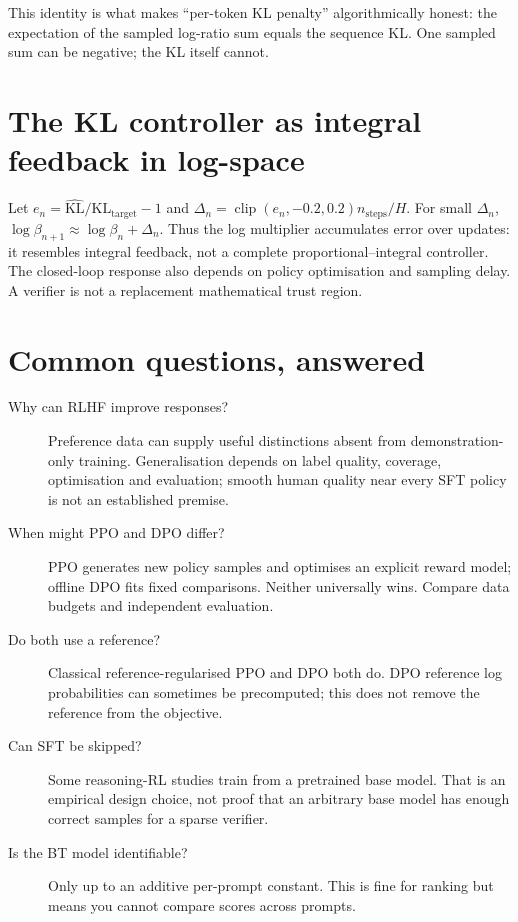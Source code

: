 \documentclass[11pt,oneside]{scrbook}
\begin{document}
This identity is what makes ``per-token KL penalty'' algorithmically
honest: the expectation of the sampled log-ratio sum equals the sequence KL.
One sampled sum can be negative; the KL itself cannot.

\section{The KL controller as integral feedback in log-space}
Let $e_n=\widehat{\mathrm{KL}}/\mathrm{KL}_{\mathrm{target}}-1$ and
$\Delta_n=\operatorname{clip}(e_n,-0.2,0.2)n_{\mathrm{steps}}/H$.
For small $\Delta_n$, $\log\beta_{n+1}\approx\log\beta_n+\Delta_n$.
Thus the log multiplier accumulates error over updates: it resembles integral
feedback, not a complete proportional--integral controller. The closed-loop
response also depends on policy optimisation and sampling delay. A verifier
is not a replacement mathematical trust region.

\section{Common questions, answered}

\begin{description}
  \item[Why can RLHF improve responses?] Preference data can supply useful
    distinctions absent from demonstration-only training. Generalisation depends
    on label quality, coverage, optimisation and evaluation; smooth human quality
    near every SFT policy is not an established premise.
  \item[When might PPO and DPO differ?] PPO generates new policy samples and
    optimises an explicit reward model; offline DPO fits fixed comparisons.
    Neither universally wins. Compare data budgets and independent evaluation.
  \item[Do both use a reference?] Classical reference-regularised PPO and DPO
    both do. DPO reference log probabilities can sometimes be precomputed;
    this does not remove the reference from the objective.
  \item[Can SFT be skipped?] Some reasoning-RL studies train from a pretrained
    base model. That is an empirical design choice, not proof that an arbitrary
    base model has enough correct samples for a sparse verifier.

  \item[Is the BT model identifiable?] Only up to an additive
    per-prompt constant. This is fine for ranking but means you
    cannot compare scores across prompts.
\end{description}
\end{document}
